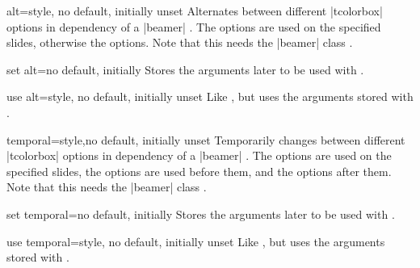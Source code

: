 \clearpage

\begin{docTcbKey}[][doc new={2025-05-28}]{alt}{=}{style, no default, initially unset}
Alternates between different |tcolorbox| options in dependency of a |beamer| .
The  options are used on the specified slides, otherwise the  options.
Note that this needs the |beamer| class \cite{tantau:beamer}.
\end{docTcbKey}

\begin{docTcbKey}[][doc new={2025-07-07}]{set alt}{=}{no default, initially \brackets{}\brackets{}}
Stores the arguments later to be used with .
\end{docTcbKey}

\begin{docTcbKey}[][doc new={2025-07-07}]{use alt}{=}{style, no default, initially unset}
Like , but uses the arguments stored with .
\end{docTcbKey}

\begin{docTcbKey}[][doc new={2025-05-28}]{temporal}{=}{style,\linebreak no default, initially unset}
Temporarily changes between different |tcolorbox| options in dependency of a |beamer| .
The  options are used on the specified slides,
the  options are used before them, and
the  options after them.
Note that this needs the |beamer| class \cite{tantau:beamer}.
\end{docTcbKey}

\begin{docTcbKey}[][doc new={2025-07-07}]{set temporal}{=}{no default, initially \brackets{}\brackets{}\brackets{}}
Stores the arguments later to be used with .
\end{docTcbKey}

\begin{docTcbKey}[][doc new={2025-07-07}]{use temporal}{=}{style, no default, initially unset}
Like , but uses the arguments stored with .
\end{docTcbKey}


